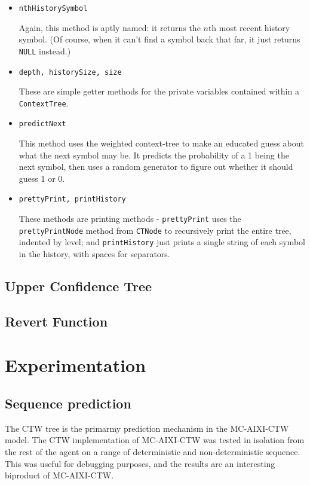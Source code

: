\documentclass[pdftex,twoside,a4paper]{report}
\newcommand{\mac}{MC-AIXI-CTW}
\begin{document}
\begin{itemize}
{    This is a simple getter method for the weighted probability of the root - which is the probability of the entire context tree.
  }
\item{\texttt{nthHistorySymbol}
    
    Again, this method is aptly named: it returns the $n$th most recent history symbol. (Of course, when it can't find a symbol back that far, it just returns \texttt{NULL} instead.)
  }
\item{\texttt{depth, historySize, size}
    
    These are simple getter methods for the private variables contained within a \texttt{ContextTree}.
  }
\item{\texttt{predictNext}
    
    This method uses the weighted context-tree to make an educated guess about what the next symbol may be. It predicts the probability of a 1 being the next symbol, then uses a random generator to figure out whether it should guess 1 or 0.
  }
\item{\texttt{prettyPrint, printHistory}
    
    These methods are printing methods - \texttt{prettyPrint} uses the \texttt{prettyPrintNode} method from \texttt{CTNode} to recursively print the entire tree, indented by level; and \texttt{printHistory} just prints a single string of each symbol in the history, with spaces for separators.
  }
\end{itemize}
\section{Upper Confidence Tree}

\section{Revert Function}
\chapter{Experimentation}
\section{Sequence prediction}
\label{sec:Sequence prediction}
The CTW tree is the primarmy prediction mechanism in the \mac{} model. The CTW implementation of \mac{} was tested in isolation from the rest of the agent on a range of deterministic and non-deterministic sequence. This was useful for debugging purposes, and the results are an interesting biproduct of \mac{}.
\end{document}
